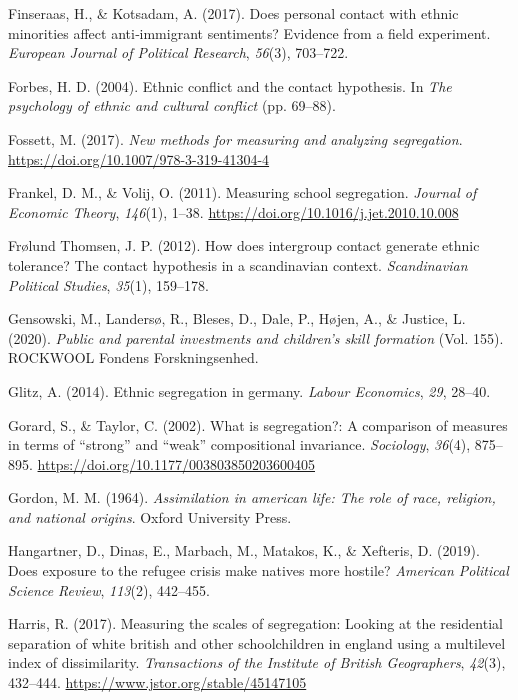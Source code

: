 \documentclass[
]{book}
\newlength{\cslhangindent}
\newenvironment{CSLReferences}[2] %
 {\begin{list}{}{%
  \setlength{\itemindent}{0pt}
  \setlength{\leftmargin}{0pt}
  \setlength{\parsep}{0pt}
  \ifodd #1
   \setlength{\leftmargin}{\cslhangindent}
   \setlength{\itemindent}{-1\cslhangindent}
  \fi
  \setlength{\itemsep}{#2\baselineskip}}}
 {\end{list}}
\begin{document}
\begin{CSLReferences}{1}{0}
Finseraas, H., \& Kotsadam, A. (2017). Does personal contact with ethnic minorities affect anti‐immigrant sentiments? Evidence from a field experiment. \emph{European Journal of Political Research}, \emph{56}(3), 703--722.

Forbes, H. D. (2004). Ethnic conflict and the contact hypothesis. In \emph{The psychology of ethnic and cultural conflict} (pp. 69--88).

Fossett, M. (2017). \emph{New methods for measuring and analyzing segregation}. \url{https://doi.org/10.1007/978-3-319-41304-4}

Frankel, D. M., \& Volij, O. (2011). Measuring school segregation. \emph{Journal of Economic Theory}, \emph{146}(1), 1--38. \url{https://doi.org/10.1016/j.jet.2010.10.008}

Frølund Thomsen, J. P. (2012). How does intergroup contact generate ethnic tolerance? The contact hypothesis in a scandinavian context. \emph{Scandinavian Political Studies}, \emph{35}(1), 159--178.

Gensowski, M., Landersø, R., Bleses, D., Dale, P., Højen, A., \& Justice, L. (2020). \emph{Public and parental investments and children's skill formation} (Vol. 155). ROCKWOOL Fondens Forskningsenhed.

Glitz, A. (2014). Ethnic segregation in germany. \emph{Labour Economics}, \emph{29}, 28--40.

Gorard, S., \& Taylor, C. (2002). What is segregation?: A comparison of measures in terms of {``strong''} and {``weak''} compositional invariance. \emph{Sociology}, \emph{36}(4), 875--895. \url{https://doi.org/10.1177/003803850203600405}

Gordon, M. M. (1964). \emph{Assimilation in american life: The role of race, religion, and national origins}. Oxford University Press.

Hangartner, D., Dinas, E., Marbach, M., Matakos, K., \& Xefteris, D. (2019). Does exposure to the refugee crisis make natives more hostile? \emph{American Political Science Review}, \emph{113}(2), 442--455.

Harris, R. (2017). Measuring the scales of segregation: Looking at the residential separation of white british and other schoolchildren in england using a multilevel index of dissimilarity. \emph{Transactions of the Institute of British Geographers}, \emph{42}(3), 432--444. \url{https://www.jstor.org/stable/45147105}


\end{CSLReferences}
\end{document}
